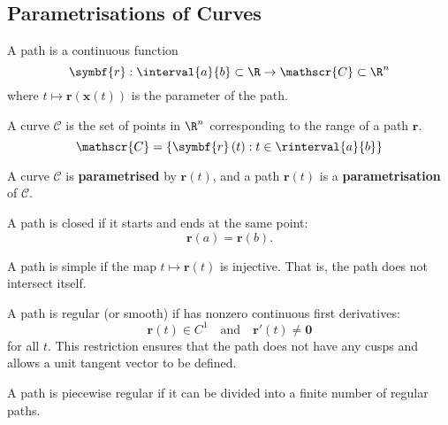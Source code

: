 \documentclass{article}
\begin{document}
\subsection{Parametrisations of Curves}
\begin{definition}[Path]
    A path is a continuous function
    \begin{equation*}
        \symbf{r} : \interval{a}{b} \subset \R \to \mathscr{C} \subset \R^n
    \end{equation*}
    where \(t \mapsto \symbf{r}\left( \symbf{x}\left( t \right) \right)\)
    is the parameter of the path.
\end{definition}
\begin{definition}[Curve]
    A curve \(\mathscr{C}\) is the set of points in \(\R^n\)
    corresponding to the range of a path \(\symbf{r}\).
    \begin{equation*}
        \mathscr{C} = \left\{ \symbf{r}\left( t \right) : t \in \rinterval{a}{b} \right\}
    \end{equation*}
\end{definition}
A curve \(\mathscr{C}\) is \textbf{parametrised} by \(\symbf{r}\left( t \right)\),
and a path \(\symbf{r}\left( t \right)\) is a \textbf{parametrisation}
of \(\mathscr{C}\).
\begin{definition}
    A path is closed if it starts and ends at the same point:
    \begin{equation*}
        \symbf{r}\left( a \right) = \symbf{r}\left( b \right).
    \end{equation*}
\end{definition}
\begin{definition}
    A path is simple if the map \(t \mapsto \symbf{r}\left( t \right)\)
    is injective. That is, the path does not intersect itself.
\end{definition}
\begin{definition}
    A path is regular (or smooth) if has nonzero continuous first derivatives:
    \begin{equation*}
        \symbf{r}\left( t \right) \in C^1 \quad \text{and} \quad
        \symbf{r}'\left( t \right) \neq \symbf{0}
    \end{equation*}
    for all \(t\). This restriction ensures that the path does not have
    any cusps and allows a unit tangent vector to be defined.
\end{definition}
\begin{definition}
    A path is piecewise regular if it can be divided into a finite
    number of regular paths.
\end{definition}
\end{document}
